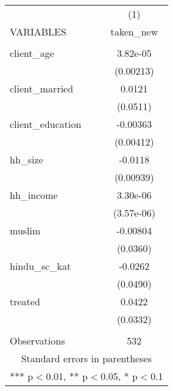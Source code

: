 \begin{tabular}{lc} \hline
 & (1) \\
VARIABLES & taken\_new \\ \hline
 &  \\
client\_age & 3.82e-05 \\
 & (0.00213) \\
client\_married & 0.0121 \\
 & (0.0511) \\
client\_education & -0.00363 \\
 & (0.00412) \\
hh\_size & -0.0118 \\
 & (0.00939) \\
hh\_income & 3.30e-06 \\
 & (3.57e-06) \\
muslim & -0.00804 \\
 & (0.0360) \\
hindu\_sc\_kat & -0.0262 \\
 & (0.0490) \\
treated & 0.0422 \\
 & (0.0332) \\
 &  \\
 Observations & 532 \\ \hline
\multicolumn{2}{c}{ Standard errors in parentheses} \\
\multicolumn{2}{c}{ *** p$<$0.01, ** p$<$0.05, * p$<$0.1} \\
\end{tabular}
